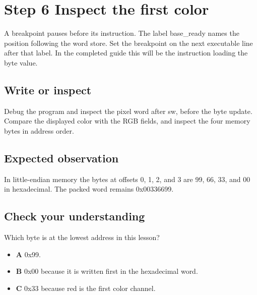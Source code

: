 \section{Step 6 Inspect the first
  color}\label{002-single-pixel-s06-step-6-inspect-the-first-color}

A breakpoint pauses before its instruction. The label base\_ready names
the position following the word store. Set the breakpoint on the next
executable line after that label. In the completed guide this will be
the instruction loading the byte value.

\subsection{Write or
  inspect}\label{002-single-pixel-s06-write-or-inspect}

Debug the program and inspect the pixel word after sw, before the byte
update. Compare the displayed color with the RGB fields, and inspect the
four memory bytes in address order.

\subsection{Expected
  observation}\label{002-single-pixel-s06-expected-observation}

In little-endian memory the bytes at offsets 0, 1, 2, and 3 are 99, 66,
33, and 00 in hexadecimal. The packed word remains 0x00336699.

\subsection{Check your
  understanding}\label{002-single-pixel-s06-check-your-understanding}

Which byte is at the lowest address in this lesson?

\begin{itemize}
  \tightlist
  \item
        \textbf{A} 0x99.
  \item
        \textbf{B} 0x00 because it is written first in the hexadecimal word.
  \item
        \textbf{C} 0x33 because red is the first color channel.
\end{itemize}
